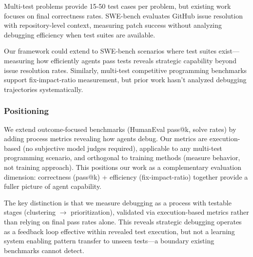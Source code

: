 Multi-test problems provide 15-50 test cases per problem, but existing work focuses on final correctness rates. SWE-bench evaluates GitHub issue resolution with repository-level context, measuring patch success without analyzing debugging efficiency when test suites are available.

Our framework could extend to SWE-bench scenarios where test suites exist---measuring how efficiently agents pass tests reveals strategic capability beyond issue resolution rates. Similarly, multi-test competitive programming benchmarks support fix-impact-ratio measurement, but prior work hasn't analyzed debugging trajectories systematically.

\subsubsection{Positioning}

We extend outcome-focused benchmarks (HumanEval pass@k, solve rates) by adding process metrics revealing how agents debug. Our metrics are execution-based (no subjective model judges required), applicable to any multi-test programming scenario, and orthogonal to training methods (measure behavior, not training approach). This positions our work as a complementary evaluation dimension: correctness (pass@k) + efficiency (fix-impact-ratio) together provide a fuller picture of agent capability.

The key distinction is that we measure debugging as a process with testable stages (clustering $\rightarrow$ prioritization), validated via execution-based metrics rather than relying on final pass rates alone. This reveals strategic debugging operates as a feedback loop effective within revealed test execution, but not a learning system enabling pattern transfer to unseen tests---a boundary existing benchmarks cannot detect.

